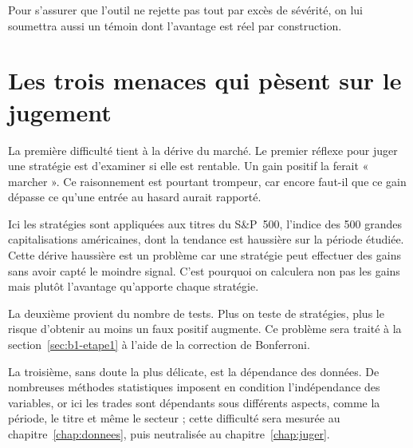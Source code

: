Pour s'assurer que l'outil ne rejette pas tout par excès de sévérité,
on lui soumettra aussi un témoin dont l'avantage est réel par construction.


\section*{Les trois menaces qui pèsent sur le jugement}
\label{sec:menaces}


La première difficulté tient à la dérive du marché.
Le premier réflexe pour juger une stratégie est d'examiner si elle
est rentable. Un gain positif la ferait « marcher ». Ce raisonnement
est pourtant trompeur, car encore faut-il que ce gain dépasse ce
qu'une entrée au hasard aurait rapporté.

Ici les stratégies sont appliquées aux titres du S\&P~500,
l'indice des 500 grandes capitalisations américaines,
dont la tendance est haussière sur la période étudiée.
Cette dérive haussière est un problème car une stratégie peut effectuer
des gains sans avoir capté le moindre signal.
C'est pourquoi on calculera non pas les gains mais plutôt l'avantage
qu'apporte chaque stratégie.

La deuxième provient du nombre de tests. Plus on teste de stratégies,
plus le risque d'obtenir au moins un faux
positif augmente. Ce problème sera traité à la
section~\ref{sec:b1-etape1} à l'aide de la correction de Bonferroni.

La troisième, sans doute la plus délicate, est la dépendance
des données. De nombreuses méthodes statistiques
imposent en condition l'indépendance des variables, or ici les trades sont
dépendants sous différents aspects, comme la période, le titre et même le secteur ;
cette difficulté sera mesurée au chapitre~\ref{chap:donnees}, puis neutralisée
au chapitre~\ref{chap:juger}.

